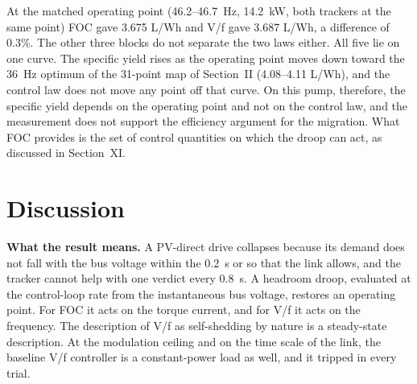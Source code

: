 \documentclass[journal]{IEEEtran}
\begin{document}
At the matched operating point (46.2--46.7~Hz, 14.2~kW, both trackers at the same point) FOC gave 3.675 L/Wh and V/f gave 3.687 L/Wh, a difference of 0.3\%. The other three blocks do not separate the two laws either. All five lie on one curve. The specific yield rises as the operating point moves down toward the 36~Hz optimum of the 31-point map of Section~II (4.08--4.11 L/Wh), and the control law does not move any point off that curve. On this pump, therefore, the specific yield depends on the operating point and not on the control law, and the measurement does not support the efficiency argument for the migration. What FOC provides is the set of control quantities on which the droop can act, as discussed in Section~XI.

\section{Discussion}

\textbf{What the result means.} A PV-direct drive collapses because its demand does not fall with the bus voltage within the 0.2~s or so that the link allows, and the tracker cannot help with one verdict every 0.8~s. A headroom droop, evaluated at the control-loop rate from the instantaneous bus voltage, restores an operating point. For FOC it acts on the torque current, and for V/f it acts on the frequency. The description of V/f as self-shedding by nature is a steady-state description. At the modulation ceiling and on the time scale of the link, the baseline V/f controller is a constant-power load as well, and it tripped in every trial.
\end{document}
